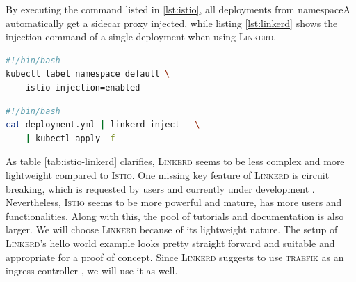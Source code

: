 By executing the command listed in \ref{lst:istio}, all deployments from namespaceA automatically get a sidecar proxy injected, while listing \ref{lst:linkerd} shows the injection command of a single deployment when using \textsc{Linkerd}.

\begin{lstlisting}[language=bash,caption={Injection of sidecards into deployments of a namespace in \textsc{Istio}},label={lst:istio}]
#!/bin/bash
kubectl label namespace default \
	istio-injection=enabled
\end{lstlisting}

\begin{lstlisting}[language=bash,caption={Injection of sidecards into a deployment in \textsc{Linkerd}}, label={lst:linkerd}]
#!/bin/bash
cat deployment.yml | linkerd inject - \
	| kubectl apply -f -
\end{lstlisting}

%
% 

As table \ref{tab:istio-linkerd} clarifies, \textsc{Linkerd} seems to be less complex and more lightweight compared to \textsc{Istio}. One missing key feature of \textsc{Linkerd} is circuit breaking, which is requested by users and currently under development \cite{linkerd-circuit-breaker}. Nevertheless, \textsc{Istio} seems to be more powerful and mature, has more users and functionalities. Along with this, the pool of tutorials and documentation is also larger.
We will choose \textsc{Linkerd} because of its lightweight nature. The setup of \textsc{Linkerd}'s hello world example looks pretty straight forward and suitable and appropriate for a proof of concept. Since \textsc{Linkerd} suggests to use \textsc{traefik} as an ingress controller \cite{linkerd-traefik}, we will use it as well.